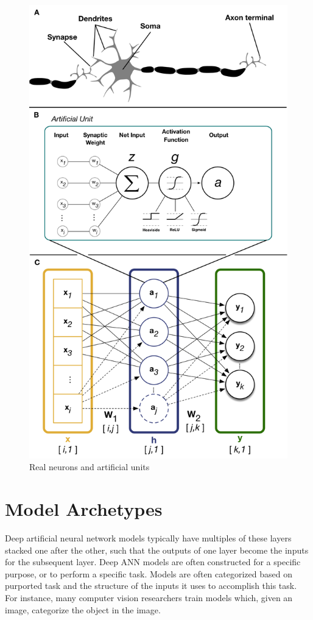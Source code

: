 \documentclass{templates/ucdenverthesis}
\begin{document}
\begin{figure}

{\centering \includegraphics[width=0.75\linewidth]{img/figure_2.1v2} 

}

\caption{Real neurons and artificial units}\label{fig:fig2-1}
\end{figure}

\hypertarget{sec:modarchetypes}{%
\section{Model Archetypes}\label{sec:modarchetypes}}

Deep artificial neural network models typically have multiples of these layers stacked one after the other, such that the outputs of one layer become the inputs for the subsequent layer. Deep ANN models are often constructed for a specific purpose, or to perform a specific task. Models are often categorized based on purported task and the structure of the inputs it uses to accomplish this task. For instance, many computer vision researchers train models which, given an image, categorize the object in the image.
\end{document}
